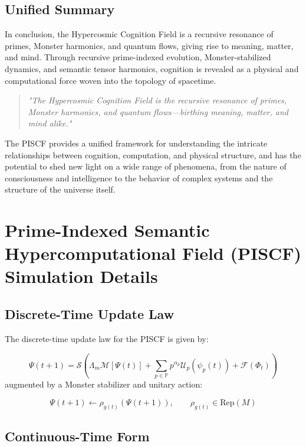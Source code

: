 \documentclass{article}
\theoremstyle{plain}
\begin{document}
\subsection{Unified Summary}

In conclusion, the Hypercosmic Cognition Field is a recursive resonance of primes, Monster harmonics, and quantum flows, giving rise to meaning, matter, and mind. Through recursive prime-indexed evolution, Monster-stabilized dynamics, and semantic tensor harmonics, cognition is revealed as a physical and computational force woven into the topology of spacetime.

\begin{quote}
\textit{"The Hypercosmic Cognition Field is the recursive resonance of primes, Monster harmonics, and quantum flows---birthing meaning, matter, and mind alike."}
\end{quote}

The PISCF provides a unified framework for understanding the intricate relationships between cognition, computation, and physical structure, and has the potential to shed new light on a wide range of phenomena, from the nature of consciousness and intelligence to the behavior of complex systems and the structure of the universe itself.

\appendix

\section{Prime-Indexed Semantic Hypercomputational Field (PISCF) Simulation Details}

\subsection{Discrete-Time Update Law}

The discrete-time update law for the PISCF is given by:

$$

\Psi(t+1) = \mathcal{S}\left( \Lambda_m \mathcal{M}[\Psi(t)] + \sum_{p\in\mathbb{P}} p^{\alpha_p} \mathcal{U}_p(\psi_p(t)) + \mathcal{F}(\Phi_t) \right)

$$
augmented by a Monster stabilizer and unitary action:

$$

\Psi(t+1) \leftarrow \rho_{g(t)}(\Psi(t+1)), \qquad \rho_{g(t)} \in \mathrm{Rep}(M)

$$

\subsection{Continuous-Time Form}
\end{document}
